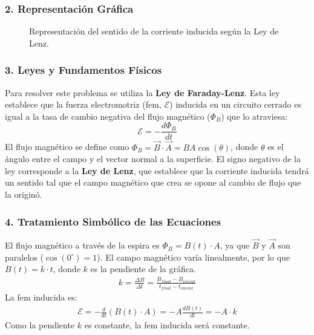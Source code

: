 \subsubsection*{2. Representación Gráfica}
\begin{figure}[H]
    \centering
    \caption{Representación del sentido de la corriente inducida según la Ley de Lenz.}
\end{figure}

\subsubsection*{3. Leyes y Fundamentos Físicos}
Para resolver este problema se utiliza la \textbf{Ley de Faraday-Lenz}. Esta ley establece que la fuerza electromotriz (fem, $\mathcal{E}$) inducida en un circuito cerrado es igual a la tasa de cambio negativa del flujo magnético ($\Phi_B$) que lo atraviesa:
$$ \mathcal{E} = - \frac{d\Phi_B}{dt} $$
El flujo magnético se define como $\Phi_B = \vec{B} \cdot \vec{A} = B A \cos(\theta)$, donde $\theta$ es el ángulo entre el campo y el vector normal a la superficie. El signo negativo de la ley corresponde a la \textbf{Ley de Lenz}, que establece que la corriente inducida tendrá un sentido tal que el campo magnético que crea se opone al cambio de flujo que la originó.

\subsubsection*{4. Tratamiento Simbólico de las Ecuaciones}
El flujo magnético a través de la espira es $\Phi_B = B(t) \cdot A$, ya que $\vec{B}$ y $\vec{A}$ son paralelos ($\cos(0^\circ)=1$).
El campo magnético varía linealmente, por lo que $B(t) = k \cdot t$, donde $k$ es la pendiente de la gráfica.
\begin{gather}
    k = \frac{\Delta B}{\Delta t} = \frac{B_{final} - B_{inicial}}{t_{final} - t_{inicial}}
\end{gather}
La fem inducida es:
\begin{gather}
    \mathcal{E} = - \frac{d}{dt}(B(t) \cdot A) = -A \frac{dB(t)}{dt} = -A \cdot k
\end{gather}
Como la pendiente $k$ es constante, la fem inducida será constante.

